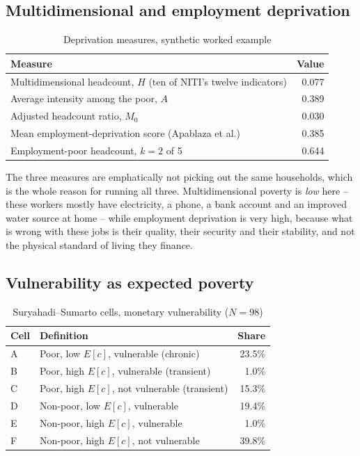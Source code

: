 \documentclass[11pt]{article}
\begin{document}
\subsection{Multidimensional and employment deprivation}

\begin{table}[h]
\centering
\caption{Deprivation measures, synthetic worked example}
\begin{tabular}{lr}
\toprule
Measure & Value \\
\midrule
Multidimensional headcount, $H$ (ten of NITI's twelve indicators) & 0.077 \\
Average intensity among the poor, $A$ & 0.389 \\
Adjusted headcount ratio, $M_0$ & 0.030 \\
\midrule
Mean employment-deprivation score (Apablaza et al.) & 0.385 \\
Employment-poor headcount, $k = 2$ of 5 & 0.644 \\
\bottomrule
\end{tabular}
\end{table}

The three measures are emphatically not picking out the same households, which is the whole
reason for running all three. Multidimensional poverty is \emph{low} here -- these workers
mostly have electricity, a phone, a bank account and an improved water source at home -- while
employment deprivation is very high, because what is wrong with these jobs is their quality,
their security and their stability, and not the physical standard of living they finance.

\subsection{Vulnerability as expected poverty}

\begin{table}[h]
\centering
\caption{Suryahadi--Sumarto cells, monetary vulnerability ($N = 98$)}
\begin{tabular}{llr}
\toprule
Cell & Definition & Share \\
\midrule
A & Poor, low $E[c]$, vulnerable (chronic) & 23.5\% \\
B & Poor, high $E[c]$, vulnerable (transient) & 1.0\% \\
C & Poor, high $E[c]$, not vulnerable (transient) & 15.3\% \\
D & Non-poor, low $E[c]$, vulnerable & 19.4\% \\
E & Non-poor, high $E[c]$, vulnerable & 1.0\% \\
F & Non-poor, high $E[c]$, not vulnerable & 39.8\% \\
\bottomrule
\end{tabular}
\end{table}
\end{document}

